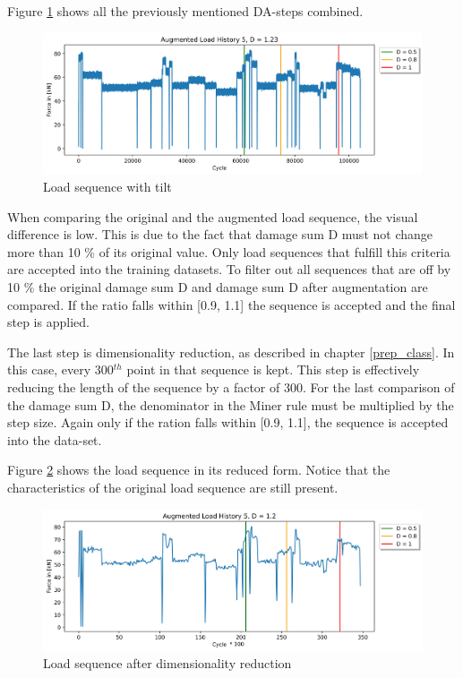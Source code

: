 Figure \ref{fig:Verlauf_5_tilt} shows all the previously mentioned DA-steps combined.

\begin{figure}[H]
	\centering
	\includegraphics[width=1\linewidth]{IMGs/Verlauf_5_tilt.jpg}
	\caption{Load sequence with tilt}
	\label{fig:Verlauf_5_tilt}
\end{figure}

When comparing the original and the augmented load sequence, the visual difference is low. This is due to the fact that damage sum D must not change more than 10 \% of its original value. Only load sequences that fulfill this criteria are accepted into the training datasets.
To filter out all sequences that are off by 10 \% the original damage sum D and damage sum D after augmentation are compared.
If the ratio falls within [0.9, 1.1] the sequence is accepted and the final step is applied.


The last step is dimensionality reduction, as described in chapter \ref{prep_class}. In this case, every 300\(^{th}\) point in that sequence is kept. This step is effectively reducing the length of the sequence by a factor of 300. For the last comparison of the damage sum D, the denominator in the Miner rule must be multiplied by the step size. Again only if the ration falls within [0.9, 1.1], the sequence is accepted into the data-set. 

Figure \ref{fig:Verlauf_5_reduced} shows the load sequence in its reduced form. Notice that the characteristics of the original load sequence are still present.
 
\begin{figure}[H]
	\centering
	\includegraphics[width=1\linewidth]{IMGs/Verlauf_5_reduced.png}
	\caption{Load sequence after dimensionality reduction}
	\label{fig:Verlauf_5_reduced}
\end{figure}


